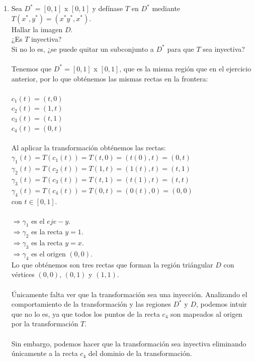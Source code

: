 \documentclass[10pt,letterpaper,fleqn]{article}
\begin{document}
\begin{enumerate}
        \item Sea $D^* = [0,1]$ x $[0, 1]$ y defínase $T$ en $D^*$ mediante $T(x^*, y^*) = (x^*y^*, x^*).$\\
        Hallar la imagen $D$.\\
        ¿Es $T$ inyectiva?\\
        Si no lo es, ¿se puede quitar un subconjunto a $D^*$ para que $T$ sea inyectiva?\\\\
        Tenemos que $D^* = [0,1]$ x $[0, 1]$, que es la misma región que en el ejercicio anterior, por lo que obténemos las mismas rectas en la frontera:\\\\
        $c_1(t) = (t, 0)$\\
        $c_2(t) = (1, t)$\\
        $c_3(t) = (t, 1)$\\
        $c_4(t) = (0, t)$\\\\
        Al aplicar la transformación obténemos las rectas:\\
        $\gamma_1(t) = T(c_1(t)) = T(t, 0) = (t(0), t) = (0, t)$\\
        $\gamma_2(t) = T(c_2(t)) = T(1, t) = (1(t), t) = (t, 1)$\\
		$\gamma_3(t) = T(c_3(t)) = T(t, 1) = (t(1), t) = (t, t)$\\        
        $\gamma_4(t) = T(c_4(t)) = T(0, t) = (0(t), 0) = (0, 0)$\\
        con $t \in [0,1]$.\\\\
        $\Rightarrow \gamma_1$ es el $eje-y$.\\
        $\Rightarrow \gamma_2$ es la recta $y = 1$.\\
        $\Rightarrow \gamma_3$ es la recta $y = x$.\\
        $\Rightarrow \gamma_4$ es el origen $(0, 0)$.\\
        Lo que obténemos son tres rectas que forman la región triángular $D$ con vértices $(0,0)$, $(0,1)$ y $(1, 1)$.\\\\   
        Únicamente falta ver que la transformación sea una inyección. Analizando el comportamiento de la transformación y las regiones $D^*$ y $D$, podemos intuir que no lo es, ya que todos los puntos de la recta $c_4$ son mapeados al origen por la transformación $T$.\\\\
        Sin embargo, podemos hacer que la transformación sea inyectiva eliminando únicamente a la recta $c_4$ del dominio de la transformación.            


\end{enumerate}
\end{document}
